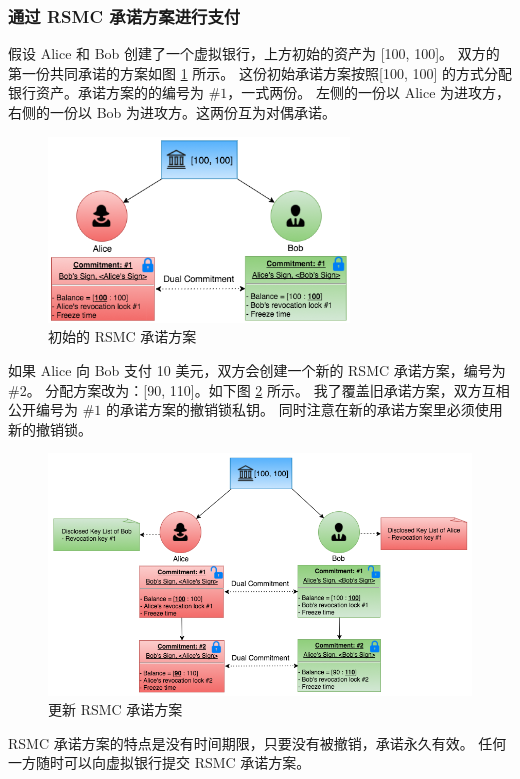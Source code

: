 \subsubsection{通过 RSMC 承诺方案进行支付}

假设 Alice 和 Bob 创建了一个虚拟银行，上方初始的资产为 [100, 100]。
双方的第一份共同承诺的方案如图 \ref{fig:rsmc_1} 所示。
这份初始承诺方案按照[100, 100] 的方式分配银行资产。承诺方案的的编号为 $\#1$，一式两份。
左侧的一份以 Alice 为进攻方，右侧的一份以 Bob 为进攻方。这两份互为对偶承诺。
\begin{figure}[h!]
    \centering
    \includegraphics[width=8cm, keepaspectratio]{../images/rsmc_1.png}
    \caption{初始的 RSMC 承诺方案}
    \label{fig:rsmc_1}
\end{figure}

如果 Alice 向 Bob 支付 10 美元，双方会创建一个新的 RSMC 承诺方案，编号为 $\#2$。
分配方案改为：[90, 110]。如下图 \ref{fig:rsmc_2} 所示。
我了覆盖旧承诺方案，双方互相公开编号为 $\#1$ 的承诺方案的撤销锁私钥。
同时注意在新的承诺方案里必须使用新的撤销锁。

\begin{figure}[h!]
    \centering
    \includegraphics[width=12cm, keepaspectratio]{../images/rsmc_2.png}
    \caption{更新 RSMC 承诺方案}
    \label{fig:rsmc_2}
\end{figure}

RSMC 承诺方案的特点是没有时间期限，只要没有被撤销，承诺永久有效。
任何一方随时可以向虚拟银行提交 RSMC 承诺方案。


